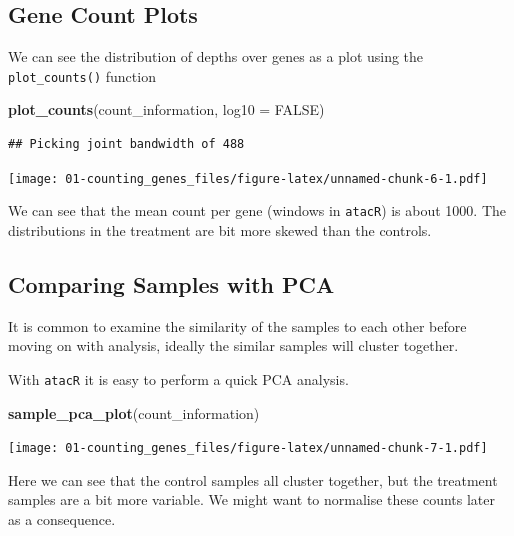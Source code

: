 \documentclass[]{book}
\newenvironment{Shaded}{\begin{snugshade}}{\end{snugshade}}
\newcommand{\DataTypeTok}[1]{\textcolor[rgb]{0.13,0.29,0.53}{#1}}
\newcommand{\KeywordTok}[1]{\textcolor[rgb]{0.13,0.29,0.53}{\textbf{#1}}}
\newcommand{\NormalTok}[1]{#1}
\newcommand{\OtherTok}[1]{\textcolor[rgb]{0.56,0.35,0.01}{#1}}
\begin{document}
\hypertarget{gene-count-plots}{%
\subsection{Gene Count Plots}\label{gene-count-plots}}

We can see the distribution of depths over genes as a plot using the \texttt{plot\_counts()} function

\begin{Shaded}
\begin{Highlighting}[]
\KeywordTok{plot_counts}\NormalTok{(count_information, }\DataTypeTok{log10 =} \OtherTok{FALSE}\NormalTok{)}
\end{Highlighting}
\end{Shaded}

\begin{verbatim}
## Picking joint bandwidth of 488
\end{verbatim}

\texttt{[image: 01-counting\_genes\_files/figure-latex/unnamed-chunk-6-1.pdf]}

We can see that the mean count per gene (windows in \texttt{atacR}) is about 1000. The distributions in the treatment are bit more skewed than the controls.

\hypertarget{comparing-samples-with-pca}{%
\subsection{Comparing Samples with PCA}\label{comparing-samples-with-pca}}

It is common to examine the similarity of the samples to each other before moving on with analysis, ideally the similar samples will cluster together.

With \texttt{atacR} it is easy to perform a quick PCA analysis.

\begin{Shaded}
\begin{Highlighting}[]
\KeywordTok{sample_pca_plot}\NormalTok{(count_information)}
\end{Highlighting}
\end{Shaded}

\texttt{[image: 01-counting\_genes\_files/figure-latex/unnamed-chunk-7-1.pdf]}

Here we can see that the control samples all cluster together, but the treatment samples are a bit more variable. We might want to normalise these counts later as a consequence.
\end{document}
